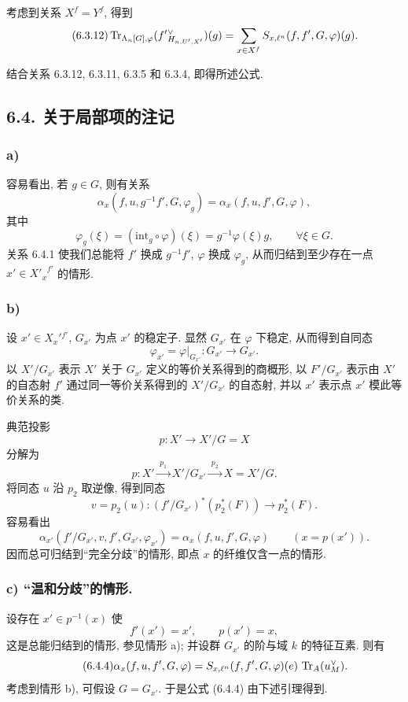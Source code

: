 考虑到关系 $X^f=Y^f$, 得到
\begin{equation}\tag{6.3.12}
\operatorname{Tr}_{\Lambda_n[G],\varphi}(f'{}^\vee_{H_{n,U',X'}})(g)=\sum_{x\in X^f}S_{x,\ell^n}(f,f',G,\varphi)(g).
\end{equation}

结合关系 6.3.12, 6.3.11, 6.3.5 和 6.3.4, 即得所述公式.

\subsection*{6.4. 关于局部项的注记}
\subsubsection*{a)} 容易看出, 若 $g\in G$, 则有关系
\begin{equation}\tag{6.4.1}
\alpha_x(f,u,g^{-1}f',G,\varphi_g)
=
\alpha_x(f,u,f',G,\varphi),
\end{equation}
其中
\begin{equation}\tag{6.4.2}
\varphi_g(\xi)=(\mathrm{int}_g\circ\varphi)(\xi)=g^{-1}\varphi(\xi)g,
\qquad \forall\xi\in G.
\end{equation}
关系 6.4.1 使我们总能将 $f'$ 换成 $g^{-1}f'$, $\varphi$ 换成 $\varphi_g$, 从而归结到至少存在一点 $x'\in {X'_x}^{f'}$ 的情形.

\subsubsection*{b)} 设 $x'\in X_x'{}^{f'}$, $G_{x'}$ 为点 $x'$ 的稳定子. 显然 $G_{x'}$ 在 $\varphi$ 下稳定, 从而得到自同态
\[
\varphi_{x'}=\varphi|_{G_{x'}}:G_{x'}\longrightarrow G_{x'}.
\]
以 $X'/G_{x'}$ 表示 $X'$ 关于 $G_{x'}$ 定义的等价关系得到的商概形, 以 $F'/G_{x'}$ 表示由 $X'$ 的自态射 $f'$ 通过同一等价关系得到的 $X'/G_{x'}$ 的自态射, 并以 $x'$ 表示点 $x'$ 模此等价关系的类.

典范投影
\[
p:X'\longrightarrow X'/G=X
\]
分解为
\[
p:X'\xrightarrow{\;p_1\;}X'/G_{x'}\xrightarrow{\;p_2\;}X=X'/G.
\]
将同态 $u$ 沿 $p_2$ 取逆像, 得到同态
\[
v=p_2(u):(f'/G_{x'})^*(p_2^*(F))\longrightarrow p_2^*(F).
\]
容易看出
\begin{equation}\tag{6.4.3}
\alpha_{x'}(f'/G_{x'},v,f',G_{x'},\varphi_{x'})
=
\alpha_x(f,u,f',G,\varphi)
\qquad (x=p(x')).
\end{equation}
因而总可归结到“完全分歧”的情形, 即点 $x$ 的纤维仅含一点的情形.

\subsubsection*{c) “温和分歧”的情形.} 设存在 $x'\in p^{-1}(x)$ 使
\[
f'(x')=x',\qquad p(x')=x,
\]
这是总能归结到的情形, 参见情形 a); 并设群 $G_{x'}$ 的阶与域 $k$ 的特征互素. 则有
\begin{equation}\tag{6.4.4}
\alpha_x(f,u,f',G,\varphi)=S_{x,\ell^n}(f,f',G,\varphi)(e)\,\operatorname{Tr}_A(u_M^\vee).
\end{equation}
考虑到情形 b), 可假设 $G=G_{x'}$. 于是公式 (6.4.4) 由下述引理得到.

